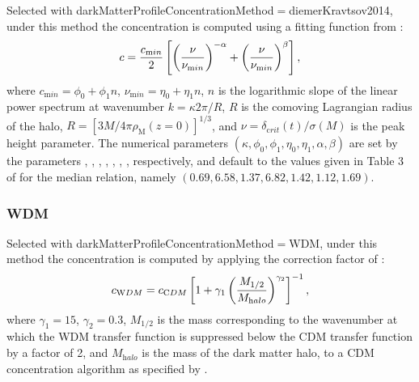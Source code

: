 Selected with {\normalfont \ttfamily darkMatterProfileConcentrationMethod}$=${\normalfont \ttfamily diemerKravtsov2014}, under this method the concentration is computed using a fitting function from \cite{diemer_universal_2014}:
\begin{equation}
c = {c_{\mathrm min} \over 2} \left[ \left({\nu\over\nu_{\mathrm min}}\right)^{-\alpha} + \left({\nu\over\nu_{\mathrm min}}\right)^{\beta} \right],
\end{equation}
where $c_{\mathrm min}=\phi_0+\phi_1 n$, $\nu_{\mathrm min}=\eta_0+\eta_1 n$, $n$ is the logarithmic slope of the linear power spectrum at wavenumber $k = \kappa 2 \pi / R$, $R$ is the comoving Lagrangian radius of the halo, $R=[3 M / 4 \pi \rho_{\mathrm M}(z=0)]^{1/3}$, and $\nu=\delta_{\mathrm crit}(t)/\sigma(M)$ is the peak height parameter. The numerical parameters $(\kappa,\phi_0,\phi_1,\eta_0,\eta_1,\alpha,\beta)$ are set by the parameters {\normalfont {}},  {\normalfont {}},  {\normalfont {}},  {\normalfont {}},  {\normalfont {}},  {\normalfont {}},  {\normalfont {}}, respectively, and default to the values given in Table 3 of \cite{diemer_universal_2014} for the median relation, namely $(0.69,6.58,1.37,6.82,1.42,1.12,1.69)$.

\subsubsection{WDM}

Selected with {\normalfont \ttfamily darkMatterProfileConcentrationMethod}$=${\normalfont \ttfamily WDM}, under this method the concentration is computed by applying the correction factor of \cite{schneider_non-linear_2012}:
\begin{equation}
c_{\mathrm WDM} = c_{\mathrm CDM} \left[ 1 + \gamma_1 \left( {M_{\mathrm 1/2} \over M_{\mathrm halo}} \right)^{\gamma_2}\right]^{-1},
\end{equation}
where $\gamma_1=15$, $\gamma_2=0.3$, $M_{\mathrm 1/2}$ is the mass corresponding to the wavenumber at which the WDM transfer function is suppressed below the CDM transfer function by a factor of 2, and $M_{\mathrm halo}$ is the mass of the dark matter halo, to a CDM concentration algorithm as specified by {\normalfont \ttfamily [darkMatterProfileConcentrationCDMMethod]}.

